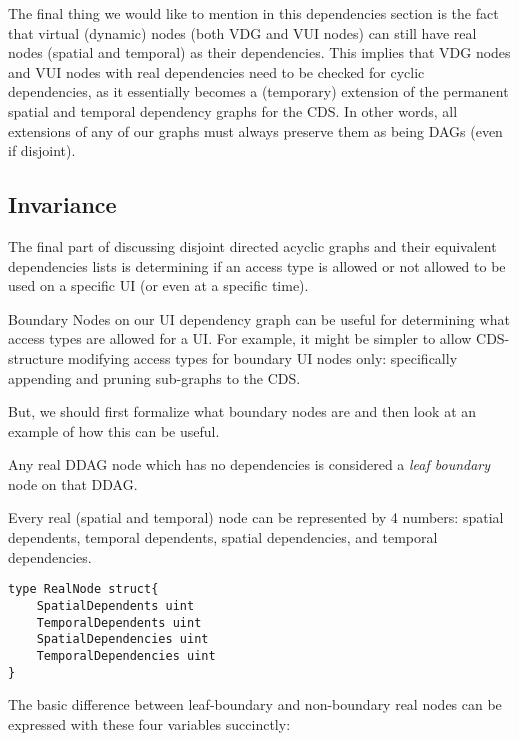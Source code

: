 The final thing we would like to mention in this dependencies section is the fact that virtual (dynamic) nodes (both VDG and VUI nodes) can still have real nodes (spatial and temporal) as their dependencies. This implies that VDG nodes and VUI nodes with real dependencies need to be checked for cyclic dependencies, as it essentially becomes a (temporary) extension of the permanent spatial and temporal dependency graphs for the CDS. In other words, all extensions of any of our graphs must always preserve them as being DAGs (even if disjoint).

\subsection{Invariance}

The final part of discussing disjoint directed acyclic graphs and their equivalent dependencies lists is determining if an access type is allowed or not allowed to be used on a specific UI (or even at a specific time).

Boundary Nodes on our UI dependency graph can be useful for determining what access types are allowed for a UI. For example, it might be simpler to allow CDS-structure modifying access types for boundary UI nodes only: specifically appending and pruning sub-graphs to the CDS. 

But, we should first formalize what boundary nodes are and then look at an example of how this can be useful.

\begin{con-def}
	\label{leaf-boundaries}
	Any real DDAG node which has no dependencies is considered a \textit{leaf boundary} node on that DDAG.
\end{con-def}

Every real (spatial and temporal) node can be represented by 4 numbers: spatial dependents, temporal dependents, spatial dependencies, and temporal dependencies.

\begin{verbatim}
type RealNode struct{
	SpatialDependents uint
	TemporalDependents uint
	SpatialDependencies uint
	TemporalDependencies uint
}
\end{verbatim}

The basic difference between leaf-boundary and non-boundary real nodes can be expressed with these four variables succinctly:

\noindent{}

